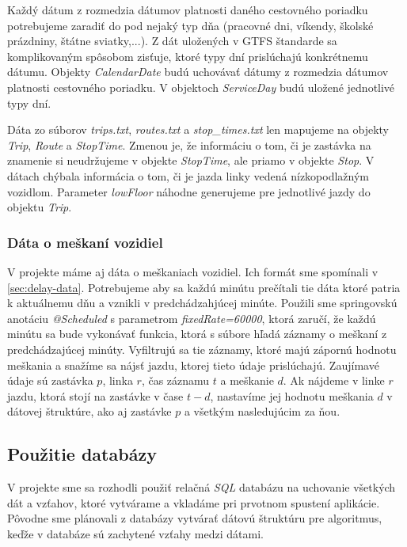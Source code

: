 Každý dátum z rozmedzia dátumov platnosti daného cestovného poriadku potrebujeme zaradiť do pod nejaký typ dňa (pracovné dni, víkendy, školské prázdniny, štátne sviatky,...). Z dát uložených v  GTFS štandarde sa komplikovaným spôsobom zisťuje, ktoré typy dní prislúchajú konkrétnemu dátumu. Objekty \textit{CalendarDate} budú uchovávať dátumy z rozmedzia dátumov platnosti cestovného poriadku. V objektoch \textit{ServiceDay} budú uložené jednotlivé typy dní. 

Dáta zo súborov \textit{trips.txt}, \textit{routes.txt} a \textit{stop\_times.txt} len mapujeme na objekty \textit{Trip}, \textit{Route} a \textit{StopTime}. Zmenou je, že informáciu o tom, či je zastávka na znamenie si neudržujeme v objekte \textit{StopTime}, ale priamo v objekte \textit{Stop}. V dátach chýbala informácia o tom, či je jazda linky vedená nízkopodlažným vozidlom. Parameter \textit{lowFloor} náhodne generujeme pre jednotlivé jazdy do objektu \textit{Trip}.

\subsubsection{Dáta o meškaní vozidiel}
V projekte máme aj dáta o meškaniach vozidiel. Ich formát sme spomínali v \ref{sec:delay-data}. Potrebujeme aby sa každú minútu prečítali tie dáta ktoré patria k aktuálnemu dňu a vznikli v predchádzahjúcej minúte. Použili sme springovskú anotáciu \textit{@Scheduled} s parametrom \textit{fixedRate=60000}, ktorá zaručí, že každú minútu sa bude vykonávať funkcia, ktorá s súbore hľadá záznamy o meškaní z predchádzajúcej minúty. Vyfiltrujú sa tie záznamy, ktoré majú zápornú hodnotu meškania a snažíme sa nájsť jazdu, ktorej tieto údaje prislúchajú. Zaujímavé údaje sú zastávka $p$, linka $r$, čas záznamu $t$ a meškanie $d$. Ak nájdeme v linke $r$ jazdu, ktorá stojí na zastávke v čase $t-d$, nastavíme jej hodnotu meškania $d$ v dátovej štruktúre, ako aj zastávke $p$ a všetkým  nasledujúcim za ňou.

\subsection{Použitie databázy}
V projekte sme sa rozhodli použiť relačná \textit{SQL} databázu na uchovanie všetkých dát a vzťahov, ktoré vytvárame a vkladáme pri prvotnom spustení aplikácie. Pôvodne sme plánovali z databázy vytvárať dátovú štruktúru pre algoritmus, keďže v databáze sú zachytené vzťahy medzi dátami.


